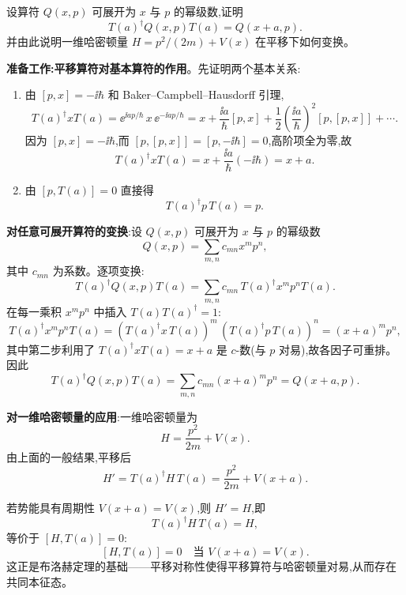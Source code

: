 \begin{question}
设算符 $Q(x,p)$ 可展开为 $x$ 与 $p$ 的幂级数,证明
\[
T(a)^\dagger Q(x,p)T(a)=Q(x+a,p).
\]
并由此说明一维哈密顿量 $H=p^2/(2m)+V(x)$ 在平移下如何变换。
\begin{solution}
	\textbf{准备工作:平移算符对基本算符的作用}。先证明两个基本关系:
	\begin{enumerate}
	\item 由 $[p,x]=-\ii\hbar$ 和 Baker--Campbell--Hausdorff 引理,
	\[
	T(a)^\dagger xT(a)=\ee^{\ii a p/\hbar}\,x\,\ee^{-\ii a p/\hbar}
	=x+\frac{\ii a}{\hbar}[p,x]+\frac12\left(\frac{\ii a}{\hbar}\right)^2[p,[p,x]]+\cdots.
	\]
	因为 $[p,x]=-\ii\hbar$,而 $[p,[p,x]]=[p,-\ii\hbar]=0$,高阶项全为零,故
	\[
	T(a)^\dagger xT(a)=x+\frac{\ii a}{\hbar}(-\ii\hbar)=x+a.
	\]
	\item 由 $[p,T(a)]=0$ 直接得
	\[
	T(a)^\dagger p\,T(a)=p.
	\]
	\end{enumerate}

	\textbf{对任意可展开算符的变换}:设 $Q(x,p)$ 可展开为 $x$ 与 $p$ 的幂级数
	\[
	Q(x,p)=\sum_{m,n}c_{mn}x^mp^n,
	\]
	其中 $c_{mn}$ 为系数。逐项变换:
	\[
	T(a)^\dagger Q(x,p)T(a)=\sum_{m,n}c_{mn}\,T(a)^\dagger x^m p^n T(a).
	\]
	在每一乘积 $x^m p^n$ 中插入 $T(a)T(a)^\dagger=1$:
	\[
	T(a)^\dagger x^m p^n T(a)=(T(a)^\dagger x\,T(a))^m\,(T(a)^\dagger p\,T(a))^n=(x+a)^m p^n,
	\]
	其中第二步利用了 $T(a)^\dagger x T(a)=x+a$ 是 $c$-数(与 $p$ 对易),故各因子可重排。因此
	\[
	T(a)^\dagger Q(x,p)T(a)=\sum_{m,n}c_{mn}(x+a)^mp^n=Q(x+a,p).
	\]

	\textbf{对一维哈密顿量的应用}:一维哈密顿量为
	\[
	H=\frac{p^2}{2m}+V(x).
	\]
	由上面的一般结果,平移后
	\[
	H'=T(a)^\dagger H\,T(a)=\frac{p^2}{2m}+V(x+a).
	\]

	若势能具有周期性 $V(x+a)=V(x)$,则 $H'=H$,即
	\[
	T(a)^\dagger H\,T(a)=H,
	\]
	等价于 $[H,T(a)]=0$:
	\[
	\boxed{[H,T(a)]=0\quad\text{当 }V(x+a)=V(x)}.
	\]
	这正是布洛赫定理的基础——平移对称性使得平移算符与哈密顿量对易,从而存在共同本征态。
	\end{solution}
\end{question}


